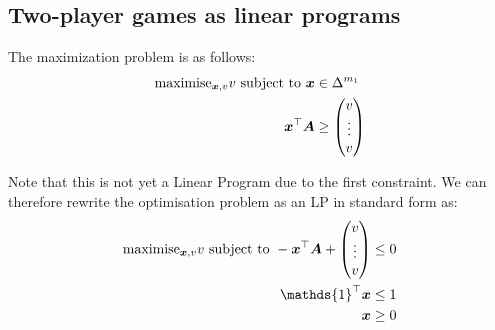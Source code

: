 \subsection{Two-player games as linear programs}
	The maximization problem is as follows:
	\begin{equation}
		\begin{split}
			\text{maximise}_{\bm{x},v} v \text{ subject to } \bm{x} & \in \Delta^{m_1} \\
			\bm{x}^\top \bm{A} & \ge \begin{pmatrix}
				v \\
				\vdots \\
				v
			\end{pmatrix}
		\end{split}
	\end{equation}

	Note that this is not yet a Linear Program due to the first constraint. We
	can therefore rewrite the optimisation problem as an LP in standard form
	as:
	\begin{equation}
		\begin{split}
			\text{maximise}_{\vect{x},v} v \text{ subject to }
			-\vect{x}^\top \vect{A} + \begin{pmatrix}
				v \\
				\vdots \\
				v
			\end{pmatrix} & \le 0 \\
			\mathds{1}^\top \vect{x} & \le 1 \\
			\vect{x} & \ge 0
		\end{split}
	\end{equation}

